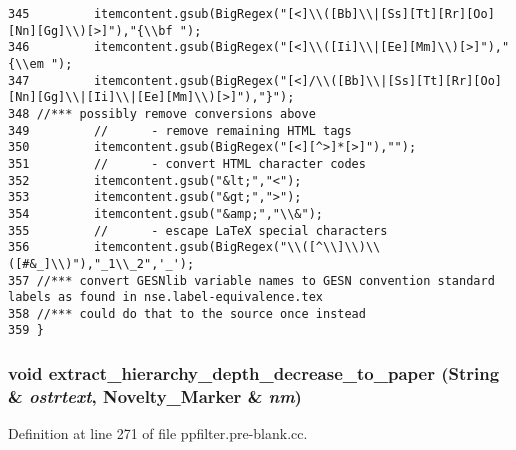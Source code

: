 \begin{verbatim}
345         itemcontent.gsub(BigRegex("[<]\\([Bb]\\|[Ss][Tt][Rr][Oo][Nn][Gg]\\)[>]"),"{\\bf ");
346         itemcontent.gsub(BigRegex("[<]\\([Ii]\\|[Ee][Mm]\\)[>]"),"{\\em ");
347         itemcontent.gsub(BigRegex("[<]/\\([Bb]\\|[Ss][Tt][Rr][Oo][Nn][Gg]\\|[Ii]\\|[Ee][Mm]\\)[>]"),"}");
348 //*** possibly remove conversions above
349         //      - remove remaining HTML tags
350         itemcontent.gsub(BigRegex("[<][^>]*[>]"),"");
351         //      - convert HTML character codes
352         itemcontent.gsub("&lt;","<");
353         itemcontent.gsub("&gt;",">");
354         itemcontent.gsub("&amp;","\\&");
355         //      - escape LaTeX special characters
356         itemcontent.gsub(BigRegex("\\([^\\]\\)\\([#&_]\\)"),"_1\\_2",'_');
357 //*** convert GESNlib variable names to GESN convention standard labels as found in nse.label-equivalence.tex
358 //*** could do that to the source once instead
359 }
\end{verbatim}\normalsize 
{}
\subsubsection{\setlength{\rightskip}{0pt plus 5cm}void extract\_\-hierarchy\_\-depth\_\-decrease\_\-to\_\-paper ({\bf String} \& {\em ostrtext}, {\bf Novelty\_\-Marker} \& {\em nm})}\label{ppfilter_8pre-blank_8cc_a6}




Definition at line 271 of file ppfilter.pre-blank.cc.

